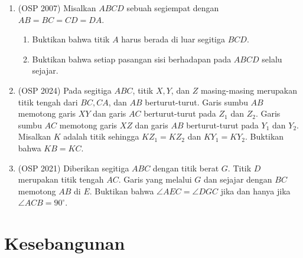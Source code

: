 \documentclass[12pt]{scrartcl}
\begin{document}
\begin{enumerate}[resume]

	\item (OSP 2007)
	Misalkan $ABCD$ sebuah segiempat dengan $AB=BC=CD=DA$.
	\begin{enumerate}
	    \item Buktikan bahwa titik $A$ harus berada di luar segitiga $BCD$.
	    \item Buktikan bahwa setiap pasangan sisi berhadapan pada $ABCD$ selalu sejajar.
	\end{enumerate}

	\item (OSP 2024)
	Pada segitiga $ABC$, titik $X, Y$, dan $Z$ masing-masing merupakan titik tengah dari $BC, CA$, dan $AB$ berturut-turut. Garis sumbu $AB$ memotong garis $XY$ dan garis $AC$ berturut-turut pada $Z_1$ dan $Z_2$. Garis sumbu $AC$ memotong garis $XZ$ dan garis $AB$ berturut-turut pada $Y_1$ dan $Y_2$. Misalkan $K$ adalah titik sehingga $KZ_1=KZ_2$ dan $KY_1=KY_2$. Buktikan bahwa $KB=KC$.

	\item (OSP 2021)
	Diberikan segitiga $ABC$ dengan titik berat $G$. Titik $D$ merupakan titik tengah $AC$. Garis yang melalui $G$ dan sejajar dengan $BC$ memotong $AB$ di $E$. Buktikan bahwa $\angle AEC=\angle DGC$ jika dan hanya jika $\angle ACB=90^\circ$.

\end{enumerate}

\section{Kesebangunan}
\end{document}
